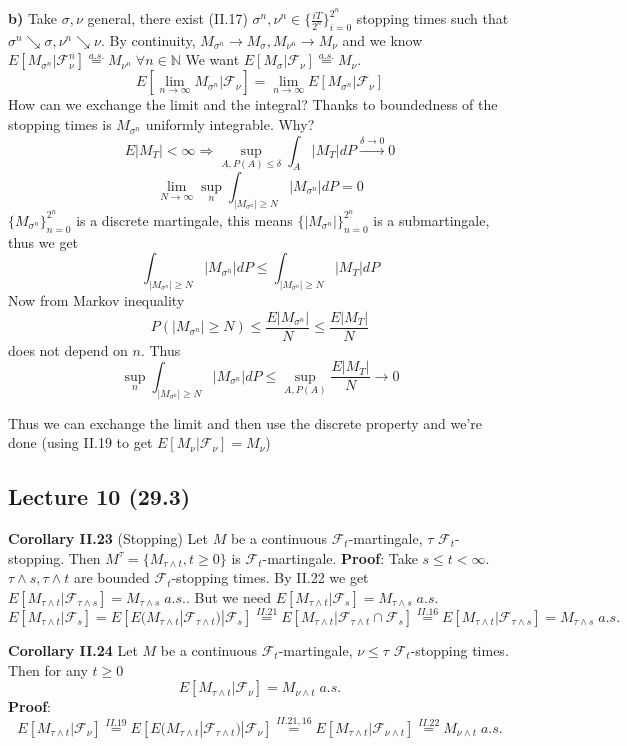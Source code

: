 \documentclass[english]{article}
\newcommand{\N}{\mathbb{N}}
\newcommand{\note}[1]{\noindent\textbf{#1}}
\newcommand{\F}{\mathcal F}
\newcommand{\as}[1]{\stackrel {a.s.}{#1}}
\begin{document}
\textbf{b)} Take $\sigma, \nu$ general, there exist (II.17) $\sigma^n, \nu^n \in \{ \frac{iT}{2^n}\}^{2^n}_{i=0}$ stopping times such that $\sigma^n \searrow \sigma, \nu^n \searrow \nu$. \newline
By continuity, $M_{\sigma^n} \to M_\sigma, M_{\nu^n} \to M_{\nu}$ and we know $E[M_{\sigma^n} | \F_\nu^n] \as = M_{\nu^n}\;\forall n\in \N$ \newline
We want $E[M_\sigma | \F_\nu] \as= M_\nu$.
$$E[\lim_{n\to \infty} M_{\sigma^n} |\F_\nu] = \lim_{n\to \infty} E[M_{\sigma^n}| \F_\nu]$$
How can we exchange the limit and the integral? Thanks to boundedness of the stopping times is $M_{\sigma^n}$ uniformly integrable. Why?
$$E|M_T| < \infty \Rightarrow \sup_{A, P(A) \leq \delta} \int_A |M_T| dP \stackrel{\delta \to 0}\to 0$$
$$\lim_{N\to \infty} \sup_{n} \int_{|M_{\sigma^n}| \geq N} |M_{\sigma^n}| dP = 0$$
$\{M_{\sigma^n}\}^{2^n}_{n=0}$ is a discrete martingale, this means $\{|M_{\sigma^n}|\}^{2^n}_{n=0}$ is a submartingale, thus we get
$$ \int_{|M_{\sigma^n}| \geq N} |M_{\sigma^n}| dP \leq \int_{|M_{\sigma^n}| \geq N} |M_T| dP$$
Now from Markov inequality
$$P(|M_{\sigma^n}| \geq N) \leq \frac{E|M_{\sigma^n}|}{N} \leq \frac{E|M_T|}{N}$$
does not depend on $n$. Thus
$$\sup_n \int_{|M_{\sigma^n}| \geq N} |M_{\sigma^n}| dP \leq \sup_{A, P(A) } \frac{E|M_T|}{N} \to 0$$
 
 Thus we can exchange the limit and then use the discrete property and we're done (using II.19 to get $E[M_\nu | \F_\nu] = M_\nu$)

\subsection*{Lecture 10 (29.3)}
\note{Corollary II.23} (Stopping) Let $M$ be a continuous $\F_t$-martingale, $\tau$ $\F_t$-stopping. Then $M^{\tau} = \{M_{\tau \wedge t}, t \geq 0 \}$ is $\F_t$-martingale. \newline
\note{Proof}: Take $s\leq t < \infty$. $\tau\wedge s, \tau\wedge t$ are bounded $\F_t$-stopping times. By II.22 we get $E[M_{\tau \wedge t} | \F_{\tau \wedge s}] = M_{\tau \wedge s} \;a.s.$. But we need $E[M_{\tau \wedge t}|\F_s] = M_{\tau \wedge s} \;a.s.$
$$E[M_{\tau \wedge t} | \F_s ] = E[E (M_{\tau \wedge t}|\F_{\tau \wedge t})|\F_s] \stackrel{II.21}= E[M_{\tau\wedge t}|\F_{\tau \wedge t} \cap \F_s] \stackrel {II.16}= E[M_{\tau\wedge t} |\F_{\tau \wedge s}] = M_{\tau \wedge s}\; a.s.$$ \newline

\note{Corollary II.24} Let $M$ be a continuous $\F_t$-martingale, $\nu \leq \tau$ $\F_t$-stopping times. Then for any $t\geq 0$
$$E[M_{\tau \wedge t} | \F_\nu] = M_{\nu \wedge t} \; a.s.$$
\note{Proof}: $$E[M_{\tau\wedge t} | \F_\nu] \stackrel{II.19}= E[E(M_{\tau \wedge t}| \F_{\tau \wedge t}) |\F_\nu] \stackrel{II.21,16}= E[M_{\tau\wedge t}| \F_{\nu\wedge t}] \stackrel{II.22}= M_{\nu\wedge t} \; a.s.$$
\end{document}
